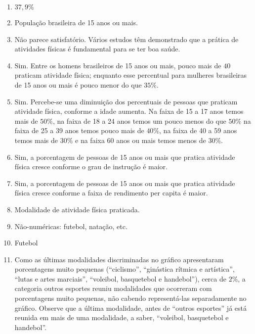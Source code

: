 \documentclass[10 pt,usenames,dvipsnames, oneside]{article}
\begin{document}
\ifdefined\prof
\begin{solucao}
\begin{enumerate}

\item $37{,}9\%$

\item População brasileira de 15 anos ou mais.

\item Não parece satisfatório. Vários estudos têm demonstrado que a prática de atividades físicas é fundamental para se ter boa saúde.

\item Sim. Entre os homens brasileiros de 15 anos ou mais, pouco mais de $40$ praticam atividade física; enquanto esse percentual para mulheres brasileiras de 15 anos ou mais é pouco menor do que $35\%.$

\item Sim. Percebe-se uma diminuição dos percentuais de pessoas que praticam atividade física, conforme a idade aumenta. Na faixa de 15 a 17 anos temos mais de $50\%$, na faixa de 18 a 24 anos temos um pouco menos do que $50\%$ na faixa de 25 a 39 anos temos pouco mais de $40\%$, na faixa de 40 a 59 anos temos mais de $30\%$ e na faixa 60 anos ou mais temos menos de $30\%$.

\item Sim, a porcentagem de pessoas de 15 anos ou mais que pratica atividade física cresce conforme o grau de instrução é maior.

\item Sim, a porcentagem de pessoas de 15 anos ou mais que pratica atividade física cresce conforme a faixa de rendimento per capita é maior.

\item Modalidade de atividade física praticada.

\item Não-numéricas: futebol, natação, etc.

\item Futebol

\item Como as últimas modalidades discriminadas no gráfico apresentaram porcentagens muito pequenas (“ciclismo”, “ginástica rítmica e artística”, “lutas e artes marciais”, “voleibol, basquetebol e handebol”), cerca de $2\%$, a categoria outros esportes reuniu modalidades que ocorreram com porcentagens muito pequenas, não cabendo representá-las separadamente no gráfico. Observe que a última modalidade, antes de “outros esportes” já está reunida em mais de uma modalidade, a saber, “voleibol, basquetebol e handebol”.


\end{enumerate}
\end{solucao}
\end{document}

